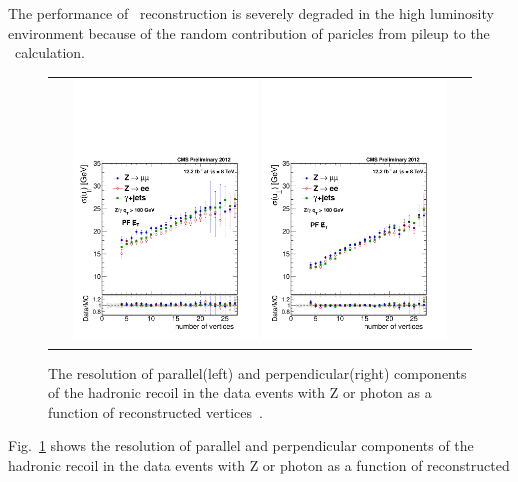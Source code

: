 The performance of \met\ reconstruction is severely degraded 
in the high luminosity environment because of the random contribution of paricles 
from pileup to the \met\ calculation. 
\begin{figure}[htp] 
\centering 
\begin{tabular}{c} 
\includegraphics[width=0.45\textwidth]{figures/Fig11PFresoNVW_para_fit.pdf} 
\includegraphics[width=0.45\textwidth]{figures/Fig11PFresoNVW_perp_fit.pdf} 
\end{tabular} 
\caption{The resolution of parallel(left) and perpendicular(right) components of the
hadronic recoil in the data events with Z or photon as a function of reconstructed
vertices~\cite{CMS-PAS-JME-12-002}.} 
\label{fig:metres} 
\end{figure} 
Fig.~\ref{fig:metres} shows the resolution of parallel and perpendicular components of 
the hadronic recoil in the data events with Z or photon as a function of reconstructed 
